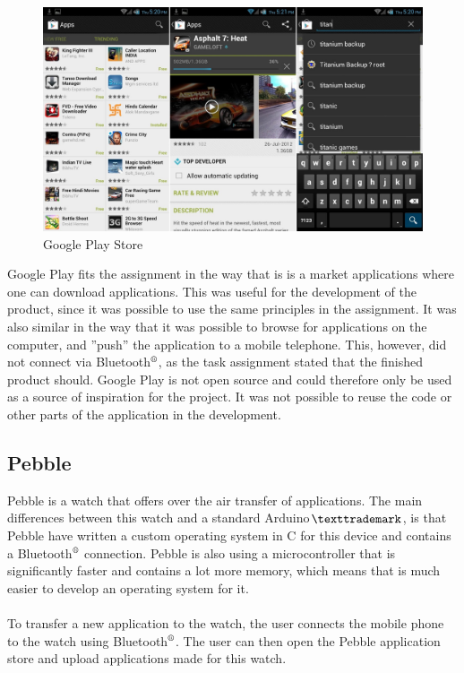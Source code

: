 \begin{figure}[H]
\includegraphics[scale=0.2]{images/Google-Play-Store-APK-3-7-15.jpg}
\caption{Google Play Store}
\end{figure}

Google Play fits the assignment in the way that is is a market applications where one can download applications. This was useful for the development of the product, since it was possible to use the same principles in the assignment. It was also similar in the way that it was possible to browse for applications on the computer, and ''push'' the application to a mobile telephone. This, however, did not connect via Bluetooth$\textsuperscript{\textregistered}$, as the task assignment stated that the finished product should. Google Play is not open source and could therefore only be used as a source of inspiration for the project. It was not possible to reuse the code or other parts of the application in the development.


\subsection{Pebble}
Pebble is a watch that offers over the air transfer of applications. The main differences between this watch and a standard Arduino$\texttrademark$, is that Pebble have written a custom operating system in C for this device and contains a Bluetooth$\textsuperscript{\textregistered}$ connection. Pebble is also using a microcontroller that is significantly faster and contains a lot more memory, which means that is much easier to develop an operating system for it.\\
\\
To transfer a new application to the watch, the user connects the mobile phone to the watch using Bluetooth$\textsuperscript{\textregistered}$. The user can then open the Pebble application store and upload applications made for this watch.

